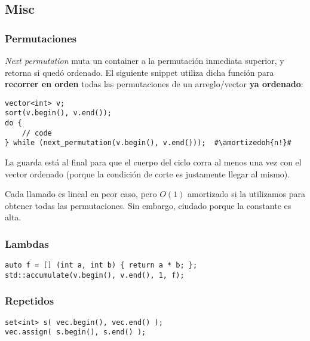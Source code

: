 

\pagebreak


\subsection{Misc}

\subsubsection*{Permutaciones}

\textit{Next permutation} muta un container a la permutación inmediata superior, y retorna si quedó ordenado. El siguiente snippet utiliza dicha función para \textbf{recorrer en orden} todas las permutaciones de un arreglo/vector \textbf{ya ordenado}:

\begin{lstlisting}
vector<int> v;
sort(v.begin(), v.end());
do {
    // code
} while (next_permutation(v.begin(), v.end()));  #\amortizedoh{n!}#
\end{lstlisting}

La guarda está al final para que el cuerpo del ciclo corra al menos una vez con el vector ordenado (porque la condición de corte es justamente llegar al mismo).

Cada llamado es lineal en peor caso, pero $O(1)$ amortizado si la utilizamos para obtener todas las permutaciones. Sin embargo, ciudado porque la constante es alta.

\subsubsection*{Lambdas}
\begin{lstlisting}
auto f = [] (int a, int b) { return a * b; };
std::accumulate(v.begin(), v.end(), 1, f);
\end{lstlisting}

\subsubsection*{Repetidos}
\begin{lstlisting}
set<int> s( vec.begin(), vec.end() );
vec.assign( s.begin(), s.end() );
\end{lstlisting}

